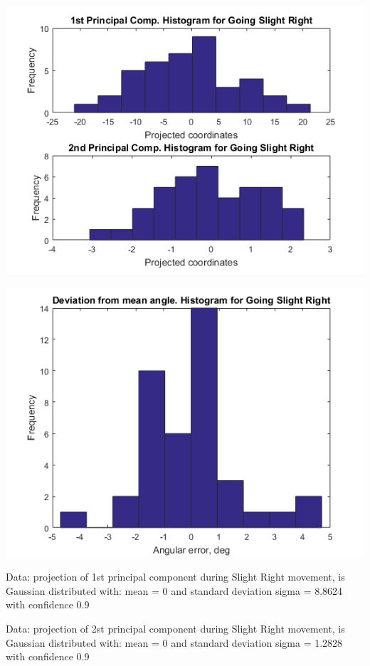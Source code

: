 \documentclass[a4paper, 12pt]{article}
\begin{document}
\begin{center}

  \includegraphics[scale=0.6]{r2}
  
  
  \includegraphics[scale=0.6]{r3}
\end{center}


Data: projection of 1st principal component during  Slight Right movement, is Gaussian distributed with: mean = 0 and standard deviation sigma = 8.8624 with confidence 0.9%




\smallskip

Data: projection of 2st principal component during  Slight Right movement, is Gaussian distributed with: mean = 0 and standard deviation sigma = 1.2828 with confidence 0.9%
\end{document}
